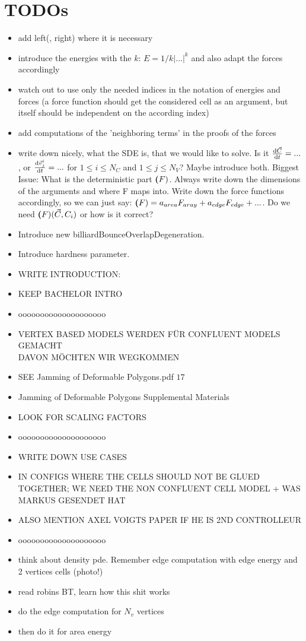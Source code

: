 \section{TODOs}

\begin{itemize}
    \item add left(, right) where it is necessary 
    \item introduce the energies with the $k$: $E = 1/k |...|^k$ and also adapt the forces accordingly 
    \item watch out to use only the needed indices in the notation of energies and forces (a force function should get the considered cell as an argument, but itself should be independent on the according index)
    \item add computations of the 'neighboring terms' in the proofs of the forces  
    \item write down nicely, what the SDE is, that we would like to solve. Is it $\frac{\mathrm{d} \vec{C}}{\mathrm{d} t} = ... $, or $\frac{\mathrm{d} \vec{v}_j^i}{\mathrm{d} t} = ... $ for $ 1 \leq i \leq N_C$ and $1 \leq j \leq N_V$? Maybe introduce both. Biggest Issue: What is the deterministic part $\textbf(F)$. Always write down the dimensions of the arguments and where F maps into. Write down the force functions accordingly, so we can just say: $\textbf(F) = a_{area} F_{aray} + a_{edge} F_{edge} + ...$. Do we need $\textbf(F)(\vec{C}, C_i)$ or how is it correct?
    \item Introduce new billiardBounceOverlapDegeneration.
    \item Introduce hardness parameter. 
    \item WRITE INTRODUCTION:
    \item KEEP BACHELOR INTRO 
    \item oooooooooooooooooooo
    \item VERTEX BASED MODELS WERDEN FÜR CONFLUENT MODELS GEMACHT \\ DAVON MÖCHTEN WIR WEGKOMMEN 
    \item SEE Jamming of Deformable Polygons.pdf $17$ 
    \item Jamming of Deformable Polygons Supplemental Materials
    \item LOOK FOR SCALING FACTORS
    \item oooooooooooooooooooo
    \item WRITE DOWN USE CASES 
    \item IN CONFIGS WHERE THE CELLS SHOULD NOT BE GLUED TOGETHER; WE NEED THE NON CONFLUENT CELL MODEL + WAS MARKUS GESENDET HAT 
    \item ALSO MENTION AXEL VOIGTS PAPER IF HE IS 2ND CONTROLLEUR 
    \item oooooooooooooooooooo
    \item think about density pde. Remember edge computation with edge energy and 2 vertices cells (photo!)
    \item read robins BT, learn how this shit works 
    \item do the edge computation for $N_v$ vertices 
    \item then do it for area energy       
\end{itemize}